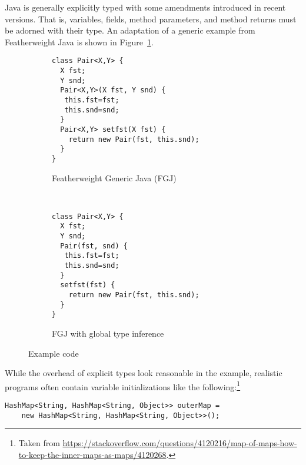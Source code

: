 Java is generally explicitly typed with some amendments introduced in
recent versions. That is, 
variables, fields, method parameters, and method returns must be
adorned with their type. An adaptation of a generic example from Featherweight Java
\cite{DBLP:journals/toplas/IgarashiPW01} 
is shown in Figure~\ref{fig:intro-example-generic-fj}.
\begin{figure}[tp]
  \begin{subfigure}[t]{0.49\linewidth}
\begin{lstlisting}
class Pair<X,Y> {
  X fst;
  Y snd;
  Pair<X,Y>(X fst, Y snd) {
   this.fst=fst;
   this.snd=snd;
  }
  Pair<X,Y> setfst(X fst) {
    return new Pair(fst, this.snd);
  }
}  
\end{lstlisting}
    \caption{Featherweight Generic Java (FGJ)}
    \label{fig:intro-example-generic-fj}
  \end{subfigure}
  ~
  \begin{subfigure}[t]{0.49\linewidth}
\begin{lstlisting}
class Pair<X,Y> {
  X fst;
  Y snd;
  Pair(fst, snd) {
   this.fst=fst; 
   this.snd=snd;
  }
  setfst(fst) {
    return new Pair(fst, this.snd);
  }
}  
\end{lstlisting}
    \caption{FGJ with global type inference}
    \label{fig:intro-example-generic-jtx}
  \end{subfigure}
  \caption{Example code}
  \label{fig:intro-example-code}
\end{figure}
While the overhead of explicit types look reasonable in the example,
realistic programs often contain variable initializations like
the following:\footnote{Taken from
  \url{https://stackoverflow.com/questions/4120216/map-of-maps-how-to-keep-the-inner-maps-as-maps/4120268}.} 
\begin{lstlisting}[basicstyle=\ttfamily\fontsize{8}{9.6}\selectfont]
  HashMap<String, HashMap<String, Object>> outerMap =
    new HashMap<String, HashMap<String, Object>>();
\end{lstlisting}

